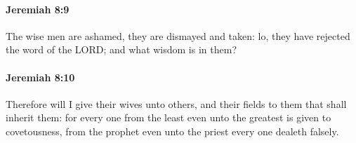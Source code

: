 		\paragraph{Jeremiah 8:9} %
			\label{JEREMIAH-8-9}

			The wise men are ashamed, they are dismayed and taken: lo, they have rejected the word of the LORD; and what wisdom is in them?


		\paragraph{Jeremiah 8:10} %
			\label{JEREMIAH-8-10}

			Therefore will I give their wives unto others, and their fields to them that shall inherit them: for every one from the least even unto the greatest is given to covetousness, from the prophet even unto the priest every one dealeth falsely.


